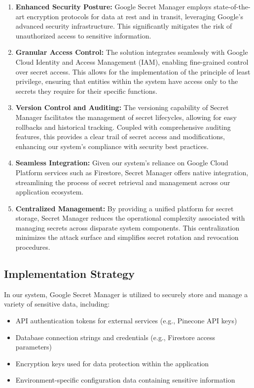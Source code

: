 \documentclass[a4paper, 12pt]{report}
\begin{document}
\begin{enumerate}
    \item \textbf{Enhanced Security Posture:} Google Secret Manager employs state-of-the-art encryption protocols for data at rest and in transit, leveraging Google's advanced security infrastructure. This significantly mitigates the risk of unauthorized access to sensitive information.
    \item \textbf{Granular Access Control:} The solution integrates seamlessly with Google Cloud Identity and Access Management (IAM), enabling fine-grained control over secret access. This allows for the implementation of the principle of least privilege, ensuring that entities within the system have access only to the secrets they require for their specific functions.

    \item \textbf{Version Control and Auditing:} The versioning capability of Secret Manager facilitates the management of secret lifecycles, allowing for easy rollbacks and historical tracking. Coupled with comprehensive auditing features, this provides a clear trail of secret access and modifications, enhancing our system's compliance with security best practices.

    \item \textbf{Seamless Integration:} Given our system's reliance on Google Cloud Platform services such as Firestore, Secret Manager offers native integration, streamlining the process of secret retrieval and management across our application ecosystem.

    \item \textbf{Centralized Management:} By providing a unified platform for secret storage, Secret Manager reduces the operational complexity associated with managing secrets across disparate system components. This centralization minimizes the attack surface and simplifies secret rotation and revocation procedures.
\end{enumerate}

\subsection{Implementation Strategy}
In our system, Google Secret Manager is utilized to securely store and manage a variety of sensitive data, including:

\begin{itemize}
    \item API authentication tokens for external services (e.g., Pinecone API keys)
    \item Database connection strings and credentials (e.g., Firestore access parameters)
    \item Encryption keys used for data protection within the application
    \item Environment-specific configuration data containing sensitive information
\end{itemize}
\end{document}

